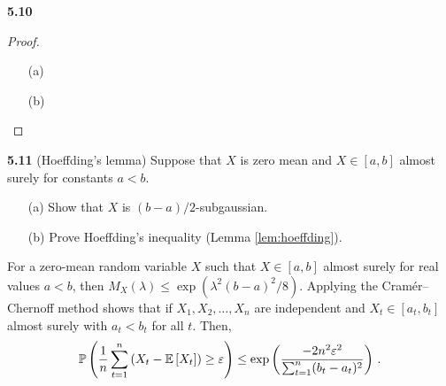 \noindent\textbf{5.10}

\begin{proof}
\begin{enumerate}
	\item[(a)]


	\item[(b)]
\end{enumerate}
\end{proof}


\noindent\textbf{5.11} (Hoeffding’s lemma) Suppose that $X$ is zero mean and $X \in [a,b]$ almost surely for constants $a <b$.
\begin{enumerate}
	\item[(a)]Show that $X$ is $(b-a)/2$-subgaussian.
	\item[(b)]Prove Hoeffding’s inequality (Lemma \ref{lem:hoeffding}).
\end{enumerate}
\begin{lemma}\label{lem:hoeffding}
	For a zero-mean random variable $X$ such that $X \in [a,b]$ almost surely for real values $a <b$, then $M_X(\lambda) \le \exp(\lambda^2 (b-a)^2 / 8)$. Applying the Cramér–Chernoff method shows that if $X_1,X_2,\ldots,X_n$ are independent and $X_t \in [a_t,b_t]$ almost surely with $a_t < b_t$ for all $t$. Then, 
	\begin{align}
		\mathbb{P} \left(\frac{1}{n} \sum_{t=1}^n \left(X_t - \mathbb{E} \left[X_t\right]\right) \ge \varepsilon \right) \le \exp\left( \frac{-2n^2\varepsilon^2}{\sum_{t=1}^n (b_t-a_t)^2 } \right)\,.
	\end{align}
\end{lemma}

